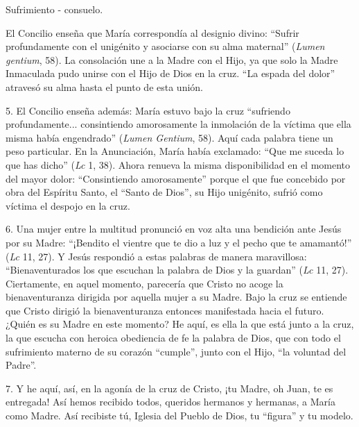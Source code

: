 			\begin{body}Sufrimiento - consuelo. \end{body}
			
			\begin{body}El Concilio enseña que María correspondía al designio divino: “Sufrir profundamente con el unigénito y asociarse con su alma maternal” (\textit{Lumen gentium}, 58). La consolación une a la Madre con el Hijo, ya que solo la Madre Inmaculada pudo unirse con el Hijo de Dios en la cruz. “La espada del dolor” atravesó su alma hasta el punto de esta unión. \end{body}
			
			\begin{body}5. El Concilio enseña además: María estuvo bajo la cruz “sufriendo profundamente... consintiendo amorosamente la inmolación de la víctima que ella misma había engendrado” (\textit{Lumen Gentium}, 58). Aquí cada palabra tiene un peso particular. En la Anunciación, María había exclamado: “Que me suceda lo que has dicho” (\textit{Lc} 1, 38). Ahora renueva la misma disponibilidad en el momento del mayor dolor: “Consintiendo amorosamente” porque el que fue concebido por obra del Espíritu Santo, el “Santo de Dios”, su Hijo unigénito, sufrió como víctima el despojo en la cruz. \end{body}
			
			\begin{body}6. Una mujer entre la multitud pronunció en voz alta una bendición ante Jesús por su Madre: “¡Bendito el vientre que te dio a luz y el pecho que te amamantó!” (\textit{Lc} 11, 27). Y Jesús respondió a estas palabras de manera maravillosa: “Bienaventurados los que escuchan la palabra de Dios y la guardan” (\textit{Lc }11, 27). Ciertamente, en aquel momento, parecería que Cristo no acoge la bienaventuranza dirigida por aquella mujer a su Madre. Bajo la cruz se entiende que Cristo dirigió la bienaventuranza entonces manifestada hacia el futuro. ¿Quién es su Madre en este momento? He aquí, es ella la que está junto a la cruz, la que escucha con heroica obediencia de fe la palabra de Dios, que con todo el sufrimiento materno de su corazón “cumple”, junto con el Hijo, “la voluntad del Padre”. \end{body}
			
			\begin{body}7. Y he aquí, así, en la agonía de la cruz de Cristo, ¡tu Madre, oh Juan, te es entregada! Así hemos recibido todos, queridos hermanos y hermanas, a María como Madre. Así recibiste tú, Iglesia del Pueblo de Dios, tu “figura” y tu modelo. \end{body}
			
